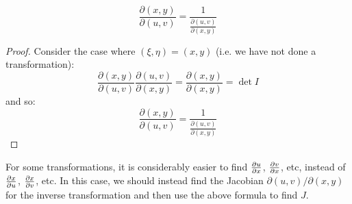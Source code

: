 \documentclass[../main.tex]{subfiles}
\begin{document}
\begin{proposition}
  \[
    \frac{\partial(x, y)}{\partial(u, v)} = \frac{1}{\frac{\partial(u, v)}{\partial(x, y)}}
  \]
  \label{JacobianReciprocal}
\end{proposition}
\begin{proof}
  Consider the case where $(\xi, \eta) = (x, y)$ (i.e. we have not done a transformation):
  \[
    \frac{\partial(x, y)}{\partial(u, v)} \frac{\partial(u, v)}{\partial(x, y)} = \frac{\partial(x, y)}{\partial(x, y)} = \det I
  \]
  and so:
  \[
    \frac{\partial(x, y)}{\partial(u, v)} = \frac{1}{\frac{\partial(u, v)}{\partial(x, y)}}
  \]
\end{proof}
For some transformations, it is considerably easier to find $\pderiv{u}{x}$, $\pderiv{v}{x}$, etc, instead of $\pderiv{x}{u}$, $\pderiv{x}{v}$, etc.
In this case, we should instead find the Jacobian $\partial(u, v)/\partial(x, y)$ for the inverse transformation and then use the above formula to find $J$.
\end{document}
